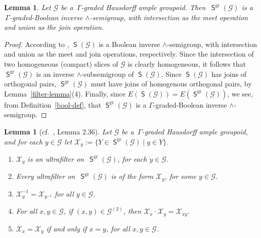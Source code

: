 \documentclass[a4paper,reqno,12pt]{amsart}
\numberwithin{equation}{section}
\theoremstyle{plain}
\newtheorem{lemma}[thm]{Lemma}
\theoremstyle{definition}
\newcommand{\gr}{\operatorname{gr}}
\newcommand{\SG}{\operatorname{\mathsf{S}}}
\begin{document}
\begin{lemma} \label{gr-inv-obj}
Let $\mathscr{G}$ be a $\, \Gamma$-graded Hausdorff ample groupoid. Then $\, \SG^{\gr}(\mathscr{G})$ is a $\, \Gamma$-graded-Boolean inverse $\land$-semigroup, with intersection as the meet operation and union as the join operation.
\end{lemma}

\begin{proof}
According to \cite[Lemma 2.32(4)]{Lawson3}, $\SG(\mathscr{G})$ is a Boolean inverse $\land$-semigroup, with intersection and union as the meet and join operations, respectively. Since the intersection of two homogeneous (compact) slices of $\mathscr{G}$ is clearly homogeneous, it follows that $\SG^{\gr}(\mathscr{G})$ is an inverse $\land$-subsemigroup of $\SG(\mathscr{G})$. Since $\SG(\mathscr{G})$ has joins of orthogonal pairs, $\SG^{\gr}(\mathscr{G})$ must have joins of homogenous orthogonal pairs, by Lemma~\ref{filter-lemma}(4). Finally, since $E(\SG(\mathscr{G})) = E(\SG^{\gr}(\mathscr{G}))$, we see, from Definition~\ref{bool-def}, that $\SG^{\gr}(\mathscr{G})$ is a $\Gamma$-graded-Boolean inverse $\land$-semigroup.
\end{proof}

\begin{lemma}[cf.\ \cite{Lawson3}, Lemma 2.36] \label{gr-inv-obj2}
Let $\mathscr{G}$ be a $\, \Gamma$-graded Hausdorff ample groupoid, and for each $y \in \mathscr{G}$ let $\mathcal{X}_y := \{Y \in \SG^{\gr}(\mathscr{G}) \mid y \in Y\}$.\begin{enumerate}[\upshape(1)]
\item $\mathcal{X}_y$ is an ultrafilter on $\, \SG^{\gr}(\mathscr{G})$, for each $y \in \mathscr{G}$.

\smallskip 

\item Every ultrafilter on $\, \SG^{\gr}(\mathscr{G})$ is of the form $\mathcal{X}_y$, for some $y \in \mathscr{G}$.

\smallskip 

\item $\mathcal{X}_y^{-1} = \mathcal{X}_{y^{-1}}$ for all $y \in \mathscr{G}$.

\smallskip 

\item For all $x,y \in \mathscr{G}$, if $(x,y) \in \mathscr{G}^{(2)}$, then $\mathcal{X}_x \cdot \mathcal{X}_y = \mathcal{X}_{xy}$.

\smallskip 

\item $\mathcal{X}_x = \mathcal{X}_y$ if and only if $x=y$, for all $x,y \in \mathscr{G}$.
\end{enumerate}
\end{lemma}
\end{document}
